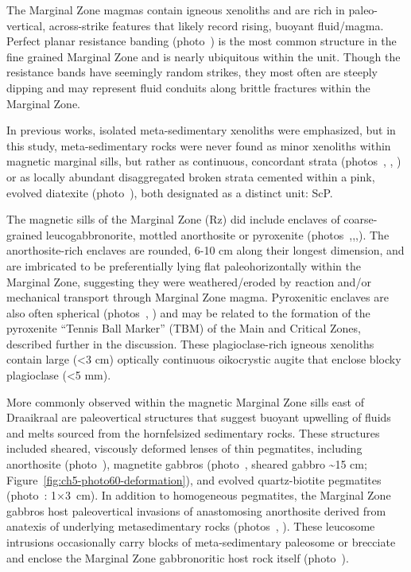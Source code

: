 The Marginal Zone magmas contain igneous xenoliths and are rich in
paleo-vertical, across-strike features that likely record rising,
buoyant fluid/magma. Perfect planar resistance banding (photo~) is the
most common structure in the fine grained Marginal Zone and is nearly
ubiquitous within the unit. Though the resistance bands have seemingly
random strikes, they most often are steeply dipping and may represent
fluid conduits along brittle fractures within the Marginal Zone.

In previous works, isolated meta-sedimentary xenoliths \citep{buick2000}
were emphasized, but in this study, meta-sedimentary rocks were
never found as minor xenoliths within magnetic marginal sills, but
rather as continuous, concordant strata (photos~, , ) or as
locally abundant disaggregated broken strata cemented within a pink,
evolved diatexite (photo~), both designated as a distinct unit: ScP.

The magnetic sills of the Marginal Zone (Rz) did include enclaves of
coarse-grained leucogabbronorite, mottled anorthosite or pyroxenite
(photos~,,,). The anorthosite-rich enclaves are rounded, 6-10 cm
along their longest dimension, and are imbricated to be preferentially
lying flat paleohorizontally within the Marginal Zone, suggesting they
were weathered/eroded by reaction and/or mechanical transport through
Marginal Zone magma. Pyroxenitic enclaves are also often spherical
(photos~, ) and may be related to the formation of the pyroxenite
``Tennis Ball Marker'' (TBM) of the Main and Critical Zones, described
further in the discussion. These plagioclase-rich igneous xenoliths
contain large (\textless3 cm) optically continuous oikocrystic augite
that enclose blocky plagioclase (\textless5 mm).

More commonly observed within the magnetic Marginal Zone sills east of
Draaikraal are paleovertical structures that suggest buoyant upwelling
of fluids and melts sourced from the hornfelsized sedimentary rocks.
These structures included sheared, viscously deformed lenses of
thin pegmatites, including anorthosite (photo~), magnetite gabbros
(photo~, sheared gabbro \textasciitilde{}15 cm;
Figure~\ref{fig:ch5-photo60-deformation}), and evolved
quartz-biotite pegmatites (photo~: 1$\times$3~cm). In addition to homogeneous
pegmatites, the Marginal Zone gabbros host paleovertical invasions of
anastomosing anorthosite derived from anatexis of underlying
metasedimentary rocks (photos~, ). These leucosome intrusions
occasionally carry blocks of meta-sedimentary paleosome or brecciate and
enclose the Marginal Zone gabbronoritic host rock itself (photo~).

